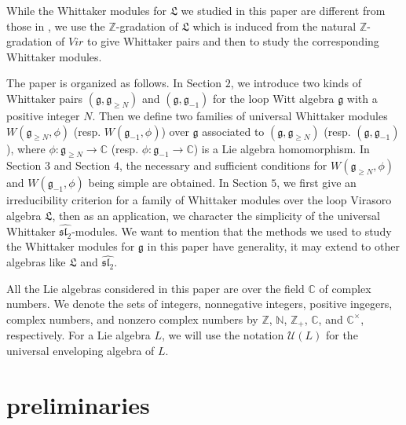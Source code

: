 \documentclass[12pt, a4paper]{amsart}
\newcommand{\fg}{\mathfrak g}
\newcommand{\C}{\mathbb{C}}
\newcommand{\N}{\mathbb N}
\newcommand{\Z}{\mathbb Z}
\newcommand{\U}{\mathcal{U}}
\theoremstyle{Theorem}
\theoremstyle{Theorem}
\numberwithin{equation}{section}
\begin{document}
While the Whittaker modules for $\mathfrak{L}$ we studied in this paper are different from those in \cite{LG},
we use the $\Z$-gradation of $\mathfrak{L}$
which is induced from the natural $\Z$-gradation of $Vir$ to give Whittaker pairs and
then to study the corresponding Whittaker modules.






The paper is organized as follows. In Section $2$, we introduce two kinds of Whittaker pairs
$(\fg,\fg_{\geq N})$ and $(\fg,\fg_{-1})$ for the loop Witt algebra $\fg$
with a positive integer $N$. Then we define two families of universal
Whittaker modules $W(\fg_{\geq N},\phi)$ (resp. $W(\fg_{-1},\phi)$) over $\fg$
associated to $(\fg,\fg_{\geq N})$ (resp. $(\fg,\fg_{-1})$), where
$\phi:\fg_{\geq N}\rightarrow \C$ (resp. $\phi:\fg_{-1}\rightarrow \C$)
is a Lie algebra homomorphism.
In Section $3$ and Section $4$, the necessary and sufficient conditions
for $W(\fg_{\geq N},\phi)$ and $W(\fg_{-1},\phi)$ being simple are obtained.
In Section $5$, we first give an irreducibility criterion for a family of
Whittaker modules over the loop Virasoro algebra $\mathfrak{L}$,
then as an application, we character the simplicity of the universal Whittaker $\widehat{\mathfrak{sl}_{2}}$-modules.
We want to mention that the methods we used to study the Whittaker modules for $\fg$ in this paper have generality,
it may extend to other algebras like $\mathfrak{L}$ and $\widehat{\mathfrak{sl}_{2}}$.


All the Lie algebras considered in this paper are over the field $\C$ of complex numbers.
We denote the sets of integers, nonnegative integers, positive ingegers, complex numbers,
and nonzero complex numbers by $\Z$, $\N$, $\Z_+$, $\C$, and $\C^\times$, respectively.
For a Lie algebra $L$, we will use the notation $\U(L)$ for the universal enveloping algebra of $L$.


\section{preliminaries}
\end{document}
